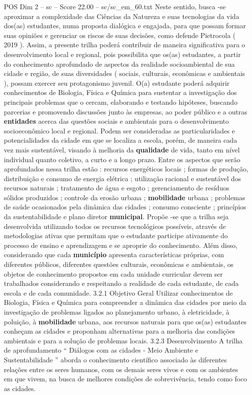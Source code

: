 \begin{textsample}{POS Dim 2 – sc – Score 22.00 – sc/sc\_em\_60.txt}
Neste sentido, busca -se aproximar a complexidade das Ciências da Natureza e suas tecnologias da vida dos(as) estudantes, numa proposta dialógica e engajada, para que possam formar suas opiniões e gerenciar os riscos de suas decisões, como defende Pietrocola ( 2019 ).
Assim, a presente trilha poderá contribuir de maneira significativa para o desenvolvimento local e regional, pois possibilita que os(as) estudantes, a partir do conhecimento aprofundado de aspectos da realidade socioambiental de sua cidade e região, de suas diversidades ( sociais, culturais, econômicas e ambientais ), possam exercer seu protagonismo juvenil.
O(a) estudante poderá adquirir conhecimentos de Biologia, Física e Química para sustentar a investigação dos principais problemas que o cercam, elaborando e testando hipóteses, buscando parcerias e promovendo discussões junto às empresas, ao poder público e a outras \textbf{entidades} acerca das questões sociais e ambientais para o desenvolvimento socioeconômico local e regional.
Podem ser consideradas as particularidades e potencialidades da cidade em que se localiza a escola, porém, de maneira cada vez mais sustentável, visando à melhoria da \textbf{qualidade} de vida, tanto em nível individual quanto coletivo, a curto e a longo prazo.
Entre os aspectos que serão aprofundados nessa trilha estão : recursos energéticos locais ; formas de produção, distribuição e consumo de energia elétrica ; utilização racional e sustentável dos recursos naturais ; tratamento de água e esgoto ; gerenciamento de resíduos sólidos produzidos ; controle da erosão urbana ; \textbf{mobilidade} urbana ; problemas de saúde ocasionados pela dinâmica das cidades ; consumo consciente ; princípios da sustentabilidade e plano diretor \textbf{municipal}.
Propõe -se que a trilha seja desenvolvida utilizando todos os recursos tecnológicos possíveis, através de metodologias ativas que permitam que o estudante participe ativamente do processo de ensino e aprendizagem e se aproprie do conhecimento.
Além disso, considerando que cada \textbf{município} apresenta características próprias, com diferentes públicos, diferentes questões culturais, econômicas e ambientais, os objetos de conhecimento propostos em cada unidade curricular devem ser trabalhados considerando e respeitando a realidade de cada estudante, de cada escola e de cada comunidade. 3.2.1 Objetivo Geral Utilizar conhecimentos de Biologia, Física e Química para compreender a dinâmica das cidades por meio da investigação de problemas ligados ao planejamento urbano, à eletricidade, à poluição, à \textbf{mobilidade} urbana, aos recursos naturais para que os(as) estudantes conheçam as cidades e proponham alternativas para a melhoria das condições ambientais e para a solução de problemas locais. 3.2.3 Desenvolvimento A trilha de aprofundamento “ Diálogos com as cidades - Meio Ambiente e Sustentabilidade ” aborda o conhecimento científico associado às diferentes relações entre os seres humanos, com os demais seres vivos e com os ambientes em que vivem, na busca de melhores condições de sobrevivência, tendo como foco as cidades.

\end{textsample}

